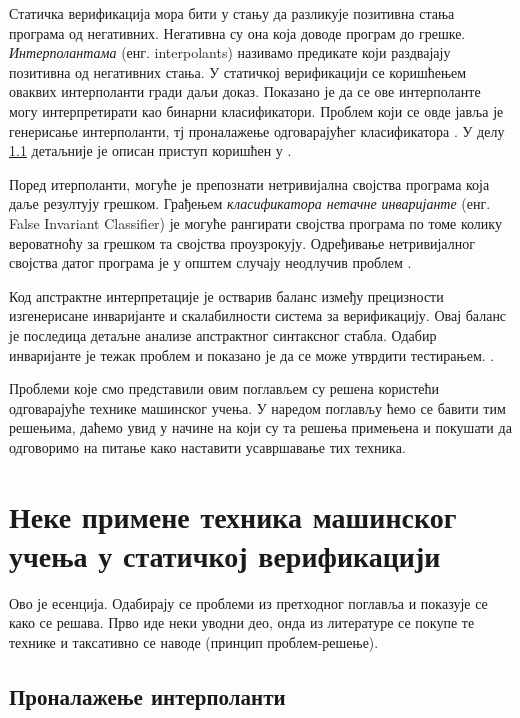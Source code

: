 \documentclass[a4paper]{article}
\begin{document}
{Статичка верификација мора бити у стању да разликује позитивна стања програма од негативних.
Негативна су она која доводе програм до грешке. \textit{Интерполантама} (енг. interpolants)
називамо предикате који раздвајају позитивна од негативних стања.
У статичкој верификацији се коришћењем оваквих интерполанти гради даљи доказ.
Показано је да се ове интерполанте могу интерпретирати као бинарни класификатори.
Проблем који се овде јавља је генерисање интерполанти, тј проналажење одговарајућег класификатора \cite{Sharma_interpolantsas}.
У делу  \ref{ssec:interpolant} детаљније је описан приступ коришћен у \cite{Sharma_interpolantsas}.

Поред итерполанти, могуће је препознати нетривијална својства програма која даље резултују грешком.
Грађењем \textit{класификатора нетачне инваријанте} (енг. False Invariant Classifier) је могуће рангирати
својства програма по томе колику вероватноћу за грешком та својства проузрокују.
Одређивање нетривијалног својства датог програма је у општем случају неодлучив проблем \cite{turing}\cite{Brun04findinglatent}.

Код апстрактне интерпретације је остварив баланс између прецизности изгенерисане инваријанте и скалабилности система за верификацију. Овај баланс је последица детаљне анализе апстрактног синтаксног стабла. Одабир инваријанте је тежак проблем и показано је да се може утврдити тестирањем.\cite{Sharma_interpolantsas} \cite{KrishnaPW15}.

Проблеми које смо представили овим поглављем су решена користећи одговарајуће технике машинског учења. У наредом поглављу ћемо се бавити тим решењима, даћемо увид у начине на који су та решења примењена и покушати да одговоримо на питање како наставити усавршавање тих техника.

\section{Неке примене техника машинског учења у статичкој верификацији}
Ово је есенција. Одабирају се проблеми из претходног поглавља и показује се
како се решава. Прво иде неки уводни део, онда из литературе се покупе те технике
и таксативно се наводе (принцип проблем-решење).

\subsection{Проналажење интерполанти}
\label{ssec:interpolant}

}
\end{document}
